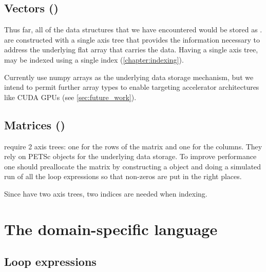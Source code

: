 \documentclass[thesis]{subfiles}
\begin{document}
\subsection{Vectors ()}

Thus far, all of the data structures that we have encountered would be stored as .
 are constructed with a single axis tree that provides the information necessary to address the underlying flat array that carries the data.
Having a single axis tree,  may be indexed using a single index (\cref{chapter:indexing}).

Currently  use numpy arrays as the underlying data storage mechanism, but we intend to permit further array types to enable targeting accelerator architectures like CUDA GPUs (see \cref{sec:future_work}).

\subsection{Matrices ()}

 require 2 axis trees: one for the rows of the matrix and one for the columns.
They rely on PETSc  objects for the underlying data storage.
To improve performance one should preallocate the matrix by constructing a  object and doing a simulated run of all the loop expressions so that non-zeros are put in the right places.

Since  have two axis trees, two indices are needed when indexing.

\section{The domain-specific language}
\label{sec:dsl}


\subsection{Loop expressions}

\end{document}
